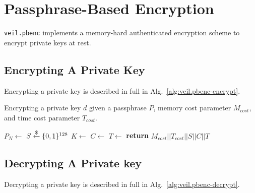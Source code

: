 \section{Passphrase-Based Encryption}\label{sec:veil.pbenc}

\texttt{veil.pbenc} implements a memory-hard authenticated encryption scheme to encrypt private keys at rest.

\subsection{Encrypting A Private Key}\label{subsec:veil.pbenc-encrypt}

Encrypting a private key is described in full in Alg.~\ref{alg:veil.pbenc-encrypt}\@.

\begin{algorithm}[ht]
    \caption{
        Encrypting a private key $d$ given a passphrase $P$, memory cost parameter $M_{cost}$, and time cost parameter
        $T_{cost}$.
    }
    \begin{algorithmic}
            \State $P_N \gets$
            \State $S \stackrel{\$}{\gets} \{0,1\}^{128}$
            \State $K \gets $
            \State {}
            \State {}
            \State {}
            \State $C \gets$
            \State $T \gets$
            \State \textbf{return} $M_{cost} || T_{cost} || S || C || T$
        \EndFunction
    \end{algorithmic}
    \label{alg:veil.pbenc-encrypt}
\end{algorithm}

\subsection{Decrypting A Private key}\label{subsec:veil.pbenc-decrypt}

Decrypting a private key is described in full in Alg.~\ref{alg:veil.pbenc-decrypt}\@.

